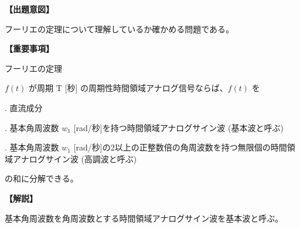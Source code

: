 \noindent \textbf{【出題意図】}

\noindent フーリエの定理について理解しているか確かめる問題である。

\vspace{1em}
\noindent \textbf{【重要事項】}

\noindent フーリエの定理

\smallskip
$f(t)$ が周期 $\textrm{T}$ [秒] の周期性時間領域アナログ信号ならば、$f(t)$ を

. 直流成分

. 基本角周波数 $w_1$ [rad/秒]を持つ時間領域アナログサイン波 (基本波と呼ぶ)

. 基本角周波数 $w_1$ [rad/秒]の2以上の正整数倍の角周波数を持つ無限個の時間領域アナログサイン波 (高調波と呼ぶ)

\smallskip
の和に分解できる。


\vspace{1em}
\noindent \textbf{【解説】}

\noindent 基本角周波数を角周波数とする時間領域アナログサイン波を基本波と呼ぶ。
